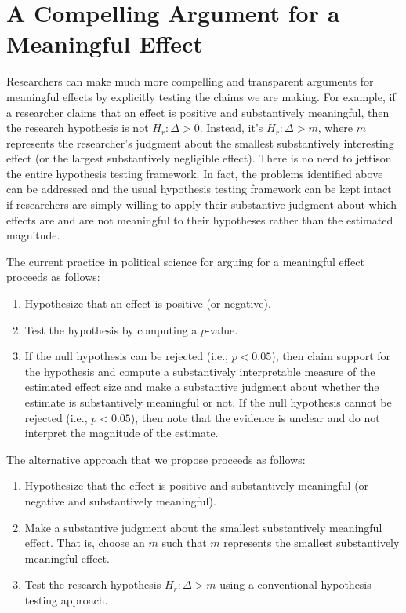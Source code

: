 \documentclass[12pt]{article}
\begin{document}
\section*{A Compelling Argument for a Meaningful Effect}

Researchers can make much more compelling and transparent arguments for meaningful effects by explicitly testing the claims we are making. For example, if  a researcher claims that an effect is positive and substantively meaningful, then the research hypothesis is not $H_r: \Delta > 0$. Instead, it's $H_r: \Delta > m$, where $m$ represents the researcher's judgment about the smallest substantively interesting effect (or the largest substantively negligible effect). There is no need to jettison the entire hypothesis testing framework. In fact, the problems identified above can be addressed and the usual hypothesis testing framework can be kept intact if researchers are simply willing to apply their substantive judgment about which effects are and are not meaningful to their hypotheses rather than the estimated magnitude. 

The current practice in political science for arguing for a meaningful effect proceeds as follows:

\singlespace
\begin{enumerate}
\item Hypothesize that an effect is positive (or negative).
\item Test the hypothesis by computing a $p$-value. 
\item If the null hypothesis can be rejected (i.e., $p < 0.05$), then claim support for the hypothesis and compute a substantively interpretable measure of the estimated effect size and make a substantive judgment about whether the estimate is substantively meaningful or not. If the null hypothesis cannot be rejected (i.e., $p < 0.05$), then note that the evidence is unclear and do not interpret the magnitude of the estimate.
\end{enumerate}
\doublespace

The alternative approach that we propose proceeds as follows:
\singlespace
\begin{enumerate}
\item Hypothesize that the effect is positive and substantively meaningful (or negative and substantively meaningful).
\item Make a substantive judgment about the smallest substantively meaningful effect. That is, choose an $m$ such that $m$ represents the smallest substantively meaningful effect.
\item Test the research hypothesis $H_r: \Delta > m$ using a conventional hypothesis testing approach.
\end{enumerate}
\end{document}
